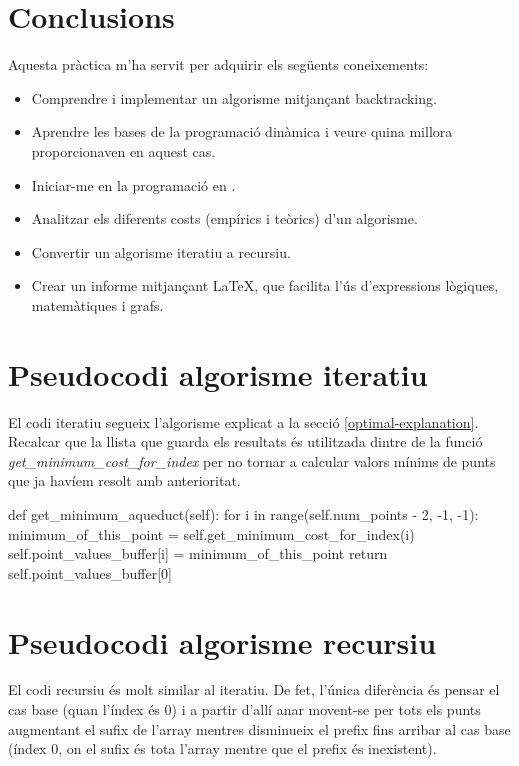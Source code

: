 \documentclass[12pt, letterpaper]{article}
\begin{document}
\section{Conclusions}
Aquesta pràctica m'ha servit per adquirir els següents coneixements:
\begin{itemize}
    \item Comprendre i implementar un algorisme mitjançant backtracking.
    \item Aprendre les bases de la programació dinàmica i veure quina millora proporcionaven en aquest cas.
    \item Iniciar-me en la programació en \cpluspluslogo.
    \item Analitzar els diferents costs (empírics i teòrics) d'un algorisme.
    \item Convertir un algorisme iteratiu a recursiu.
    \item Crear un informe mitjançant {\LaTeX}, que facilita l'ús d'expressions lògiques, matemàtiques i grafs.
\end{itemize}

\newpage

\appendix
\section{Pseudocodi algorisme iteratiu}
\label{pseudocodiiteratiu}
El codi iteratiu segueix l'algorisme explicat a la secció \ref{optimal-explanation}. \\

Recalcar que la llista que guarda els resultats és utilitzada dintre de la funció \textit{get\_minimum\_cost\_for\_index} per no tornar 
a calcular valors mínims de punts que ja havíem resolt amb anterioritat.


\begin{python}
def get_minimum_aqueduct(self):
    for i in range(self.num_points - 2, -1, -1):
        minimum_of_this_point = self.get_minimum_cost_for_index(i)
        self.point_values_buffer[i] = minimum_of_this_point
    return self.point_values_buffer[0]
\end{python}

\section{Pseudocodi algorisme recursiu}
El codi recursiu és molt similar al iteratiu. De fet, l'única diferència és pensar el cas base (quan l'índex és 0) i a partir d'allí anar movent-se per tots els punts augmentant el sufix de l'array mentres disminueix el prefix fins arribar al cas 
base (índex 0, on el sufix és tota l'array mentre que el prefix és inexistent).
\end{document}

